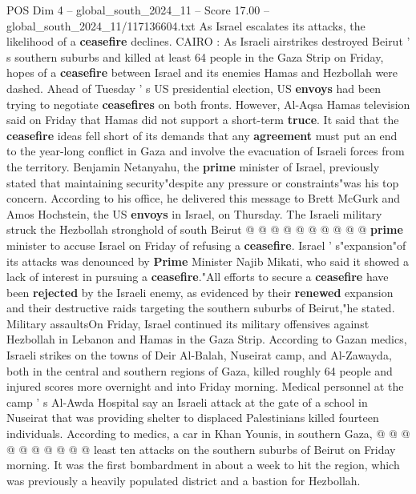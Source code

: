 \begin{textsample}{POS Dim 4 – global\_south\_2024\_11 – Score 17.00 – global\_south\_2024\_11/117136604.txt}  \label{ex:f4_pos_254}
As Israel escalates its attacks, the likelihood of a \textbf{ceasefire} declines.
CAIRO : As Israeli airstrikes destroyed Beirut ' s southern suburbs and killed at least 64 people in the Gaza Strip on Friday, hopes of a \textbf{ceasefire} between Israel and its enemies Hamas and Hezbollah were dashed.
Ahead of Tuesday ' s US presidential election, US \textbf{envoys} had been trying to negotiate \textbf{ceasefires} on both fronts.
However, Al-Aqsa Hamas television said on Friday that Hamas did not support a short-term \textbf{truce}.
It said that the \textbf{ceasefire} ideas fell short of its demands that any \textbf{agreement} must put an end to the year-long conflict in Gaza and involve the evacuation of Israeli forces from the territory.
Benjamin Netanyahu, the \textbf{prime} minister of Israel, previously stated that maintaining security"despite any pressure or constraints"was his top concern.
According to his office, he delivered this message to Brett McGurk and Amos Hochstein, the US \textbf{envoys} in Israel, on Thursday.
The Israeli military struck the Hezbollah stronghold of south Beirut @ @ @ @ @ @ @ @ @ @ \textbf{prime} minister to accuse Israel on Friday of refusing a \textbf{ceasefire}.
Israel ' s"expansion"of its attacks was denounced by \textbf{Prime} Minister Najib Mikati, who said it showed a lack of interest in pursuing a \textbf{ceasefire}."All efforts to secure a \textbf{ceasefire} have been \textbf{rejected} by the Israeli enemy, as evidenced by their \textbf{renewed} expansion and their destructive raids targeting the southern suburbs of Beirut,"he stated.
Military assaultsOn Friday, Israel continued its military offensives against Hezbollah in Lebanon and Hamas in the Gaza Strip.
According to Gazan medics, Israeli strikes on the towns of Deir Al-Balah, Nuseirat camp, and Al-Zawayda, both in the central and southern regions of Gaza, killed roughly 64 people and injured scores more overnight and into Friday morning.
Medical personnel at the camp ' s Al-Awda Hospital say an Israeli attack at the gate of a school in Nuseirat that was providing shelter to displaced Palestinians killed fourteen individuals.
According to medics, a car in Khan Younis, in southern Gaza, @ @ @ @ @ @ @ @ @ @ least ten attacks on the southern suburbs of Beirut on Friday morning.
It was the first bombardment in about a week to hit the region, which was previously a heavily populated district and a bastion for Hezbollah.

\end{textsample}
